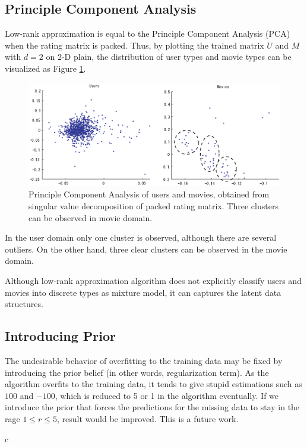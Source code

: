 \documentclass{article}
\begin{document}
\subsection{Principle Component Analysis}
Low-rank approximation is equal to the Principle Component Analysis (PCA) when the rating matrix is packed. Thus, by plotting the trained matrix $U$ and $M$ with $d=2$ on 2-D plain, the distribution of user types and movie types can be visualized as Figure \ref{fig:pca}.

\begin{figure}[htbp]
  \begin{center}
    \includegraphics[scale=.75]{figure/pca.eps}
  \end{center}
  \caption{Principle Component Analysis of users and movies, obtained from singular value decomposition of packed rating matrix. Three clusters can be observed in movie domain.}
  \label{fig:pca}
\end{figure}

In the user domain only one cluster is observed, although there are several outliers. On the other hand, three clear clusters can be observed in the movie domain. 

Although low-rank approximation algorithm does not explicitly classify users and movies into discrete types as mixture model, it can captures the latent data structures. 

\subsection{Introducing Prior}
The undesirable behavior of overfitting to the training data may be fixed by introducing the prior belief (in other words, regularization term). As the algorithm overfits to the training data, it tends to give stupid estimations such as $100$ and $-100$, which is reduced to 5 or 1 in the algorithm eventually. If we introduce the prior that forces the predictions for the missing data to stay in the rage $1 \le r \le 5$, result would be improved. This is a future work.


\if c\LaTeXe
\quad
\else
\end{document}
